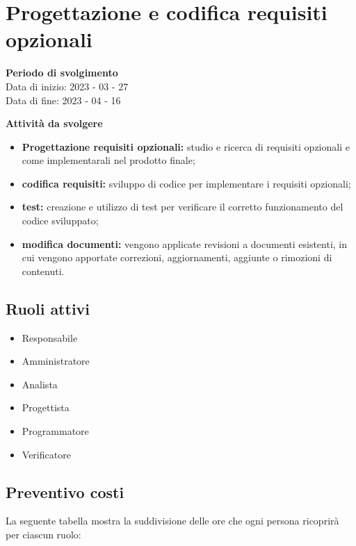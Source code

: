 \section{Progettazione e codifica requisiti opzionali}

\textbf{Periodo di svolgimento}
\\ Data di inizio: 2023 - 03 - 27 \\ Data di fine: 2023 - 04 - 16

\textbf{Attività da svolgere}
    \begin{itemize}
        \item \textbf{Progettazione requisiti opzionali:} studio e ricerca di requisiti opzionali e come implementarali nel prodotto finale; 
        \item \textbf{codifica requisiti:} sviluppo di codice per implementare i requisiti opzionali;
        \item \textbf{test:} creazione e utilizzo di test per verificare il corretto funzionamento del codice sviluppato;
        \item \textbf{modifica documenti:} vengono applicate revisioni a documenti esistenti, in cui vengono apportate correzioni, aggiornamenti, aggiunte o rimozioni di contenuti.
    \end{itemize}

\subsection{Ruoli attivi}
\begin{itemize}
    \item Responsabile 
    \item Amministratore 
    \item Analista 
    \item Progettista 
    \item Programmatore 
    \item Verificatore 
\end{itemize}

\subsection{Preventivo costi}

La seguente tabella mostra la suddivisione delle ore che ogni persona ricoprirà per ciascun ruolo:

